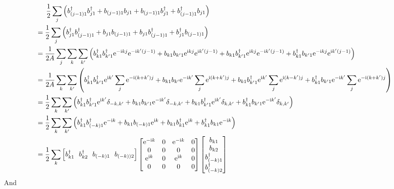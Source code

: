 \documentclass[letter]{article}
\newcommand{\e}{\mathrm{e}}
\newcommand{\ii}{\mathrm{i}}
\begin{document}
$$\begin{aligned}
    & \indent  \frac{1}{2}\sum_{j}\left(b_{(j-1)1}^{\dagger}b_{j1}^{\dagger}+b_{(j-1)1}b_{j1}+b_{(j-1)1}b_{j1}^{\dagger}+b_{(j-1)1}^{\dagger}b_{j1}\right)\\
    &= \frac{1}{2}\sum_{j}\left(b_{j1}^{\dagger}b_{(j-1)1}^{\dagger}+b_{j1}b_{(j-1)1}+b_{j1}b_{(j-1)1}^{\dagger}+b_{j1}^{\dagger}b_{(j-1)1}\right)\\
    &=\frac{1}{2A}\sum_{j}\sum_{k}\sum_{k'}\left(b_{k1}^{\dagger}b_{k'1}^{\dagger}\e^{-\ii kj}\e^{-\ii k'(j-1)}+b_{k1}b_{k'1}\e^{\ii kj}\e^{\ii k'(j-1)}+b_{k1}b_{k'1}^{\dagger}\e^{\ii kj}\e^{-\ii k'(j-1)}+b_{k1}^{\dagger}b_{k'1}\e^{-\ii kj}\e^{\ii k'(j-1)}\right)\\
    &=\frac{1}{2A}\sum_{k}\sum_{k'}\left(b_{k1}^{\dagger}b_{k'1}^{\dagger}\e^{\ii k'}\sum_j \e^{-\ii (k+k')j}+b_{k1}b_{k'}\e^{-\ii k'}\sum_j \e^{\ii (k+k')j}+b_{k1}b_{k'1}^{\dagger}\e^{\ii k'}\sum_j \e^{\ii (k-k')j}+b_{k1}^{\dagger}b_{k'1}\e^{-\ii k'}\sum_j \e^{-\ii (k+k')j}\right)\\
    &=\frac{1}{2}\sum_k\sum_{k'}\left(b_{k1}^{\dagger}b_{k'1}^{\dagger}\e^{\ii k'}\delta_{-k,k'}+b_{k1}b_{k'1}\e^{-\ii k'}\delta_{-k,k'}+b_{k1}b_{k'1}^{\dagger}\e^{\ii k'}\delta_{k,k'}+b_{k1}^{\dagger}b_{k'1}\e^{-\ii k'}\delta_{k,k'}\right)\\
    &=\frac{1}{2}\sum_k\sum_{k'}\left(b_{k1}^{\dagger}b_{(-k)1}^{\dagger}\e^{-\ii k}+b_{k1}b_{(-k)1}\e^{\ii k}+b_{k1}b_{k1}^{\dagger}\e^{\ii k}+b_{k1}^{\dagger}b_{k1}\e^{-\ii k}\right)\\
    &=\frac{1}{2}\sum_k \left[
      b_{k1}^{\dagger} \ \ 
      b_{k2}^{\dagger}\  \ 
      b_{(-k)1}\ \ 
      b_{(-k))2}\right]
     \begin{bmatrix}
          \e^{-\ii k} & 0 & \e^{-\ii k} & 0 \\
         0 &  0 & 0 &0 \\
         \e^{\ii k} &  0 & \e^{\ii k} &0\\
          0 & 0 & 0& 0
          \end{bmatrix}\begin{bmatrix}
              b_{k1}  \\
              b_{k2}  \\
              b_{(-k)1}^{\dagger}\\
              b_{(-k)2}^{\dagger}
              \end{bmatrix}
  \end{aligned}
  $$
And
\end{document}
